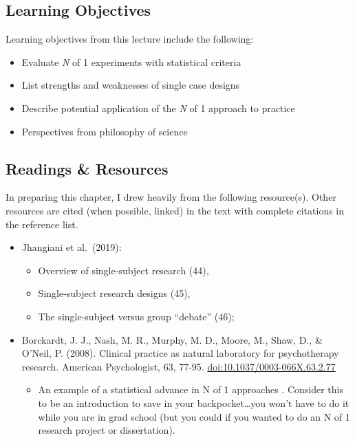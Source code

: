 \documentclass[
  english,
]{book}
\providecommand{\tightlist}{%
  \setlength{\itemsep}{0pt}\setlength{\parskip}{0pt}}
\begin{document}
\hypertarget{learning-objectives-3}{%
\subsection{Learning Objectives}\label{learning-objectives-3}}

Learning objectives from this lecture include the following:

\begin{itemize}
\tightlist
\item
  Evaluate \emph{N} of 1 experiments with statistical criteria
\item
  List strengths and weaknesses of single case designs
\item
  Describe potential application of the \emph{N} of 1 approach to practice
\item
  Perspectives from philosophy of science
\end{itemize}

\hypertarget{readings-resources-3}{%
\subsection{Readings \& Resources}\label{readings-resources-3}}

In preparing this chapter, I drew heavily from the following resource(s). Other resources are cited (when possible, linked) in the text with complete citations in the reference list.

\begin{itemize}
\tightlist
\item
  Jhangiani et al.~(2019):

  \begin{itemize}
  \tightlist
  \item
    Overview of single-subject research (44),
  \item
    Single-subject research designs (45),
  \item
    The single-subject versus group ``debate'' (46);
  \end{itemize}
\item
  Borckardt, J. J., Nash, M. R., Murphy, M. D., Moore, M., Shaw, D., \& O'Neil, P. (2008). Clinical practice as natural laboratory for psychotherapy research. American Psychologist, 63, 77-95. \url{doi:10.1037/0003-066X.63.2.77}

  \begin{itemize}
  \tightlist
  \item
    An example of a statistical advance in N of 1 approaches . Consider this to be an introduction to save in your backpocket\ldots you won't have to do it while you are in grad school (but you could if you wanted to do an N of 1 research project or dissertation).
  \end{itemize}
\end{itemize}
\end{document}
